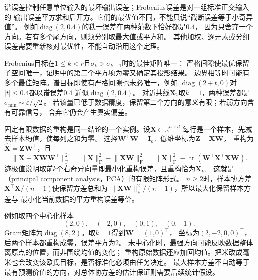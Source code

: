 谱误差控制任意单位输入的最坏输出误差；Frobenius误差是对一组标准正交输入的
输出误差平方求和后开方。它们的最优值不同，不能只说“截断误差等于小奇异值”。
例如$\operatorname{diag}(2,0.4)$的秩一误差在两种范数下恰好都是$0.4$，
因为只舍弃一个方向。若有多个尾方向，则须分别取最大值或平方和。
其他加权、逐元素或分组误差需要重新核对最优性，不能自动沿用这个定理。

Frobenius目标在$1\leq k<r$且$\sigma_k>\sigma_{k+1}$时的最佳矩阵唯一：
严格间隙使最优保留子空间唯一，证明中的第二个平方项为零又确定其投影结果。
边界相等时可能有多个最佳矩阵。谱目标即使有严格间隙也未必唯一，例如
$\operatorname{diag}(2+t,0)$对$|t|\leq0.4$都以谱误差$0.4$
近似$\operatorname{diag}(2,0.4)$。
对近共线$\bm X_{\widetilde\varepsilon}$取$k=1$，两种误差都是
$\sigma_{\min}\sim\widetilde\varepsilon/\sqrt2$。
若该量已低于数据精度，保留第二个方向的意义有限；若弱方向含有可靠信号，
舍弃它仍会产生真实偏差。

固定有限数据的重构是同一结论的一个实例。设$\bm X\in\mathbb R^{n\times d}$
每行是一个样本，先减去样本均值，使每列之和为零。
选择$\bm W^\top\bm W=\bm I_k$，低维坐标为$\bm Z=\bm X\bm W$，
重构为$\widehat{\bm X}=\bm Z\bm W^\top$，且
\[
 \lVert\bm X-\bm X\bm W\bm W^\top\rVert_{\mathrm F}^2
 =\lVert\bm X\rVert_{\mathrm F}^2-\lVert\bm X\bm W\rVert_{\mathrm F}^2
 =\lVert\bm X\rVert_{\mathrm F}^2
  -\operatorname{tr}(\bm W^\top\bm X^\top\bm X\bm W).
\]
迹极值说明取前$k$个右奇异向量即最小化重构误差，且重构恰为$\bm X_k$。
这就是（principal component analysis，PCA）的有限矩阵形式。
$n\geq2$时，样本协方差$\bm X^\top\bm X/(n-1)$使保留方差总和为
$\lVert\bm X\bm W\rVert_{\mathrm F}^2/(n-1)$，所以最大化保留样本方差与
最小化当前数据的平方重构误差等价。

例如取四个中心化样本
\[
 (2,0),\quad(-2,0),\quad(0,1),\quad(0,-1).
\]
Gram矩阵为$\operatorname{diag}(8,2)$。取$k=1$得到$\bm W=(1,0)^\top$，
坐标为$(2,-2,0,0)^\top$，后两个样本都重构成零，误差平方为$2$。
未中心化时，最强方向可能反映数据整体离原点的位置，而非围绕均值的变化；
重构原始数据还应加回均值。把米改成毫米也会改变该欧氏目标，是否标准化必须由任务决定。
最大样本方差不自动等于最有预测价值的方向，对总体协方差的估计保证则需要后续统计假设。

